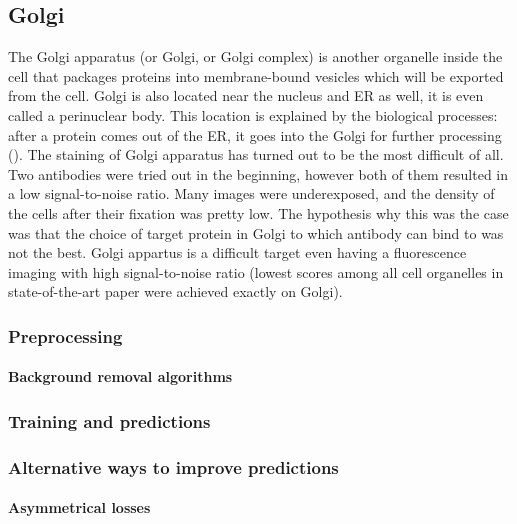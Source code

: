 \subsection{Golgi}
    The Golgi apparatus (or Golgi, or Golgi complex) is another organelle inside the cell that packages proteins into membrane-bound vesicles which will be exported from the cell. Golgi is also located near the nucleus and ER as well, it is even called a perinuclear body. This location is explained by the biological processes: after a protein comes out of the ER, it goes into the Golgi for further processing (\cite{golgi}). The staining of Golgi apparatus has turned out to be the most difficult of all. Two antibodies were tried out in the beginning, however both of them resulted in a low signal-to-noise ratio. Many images were underexposed, and the density of the cells after their fixation was pretty low. The hypothesis why this was the case was that the choice of target protein in Golgi to which antibody can bind to was not the best. Golgi appartus is a difficult target even having a fluorescence imaging with high signal-to-noise ratio (lowest scores among all cell organelles in state-of-the-art paper \cite{Cheng_2021} were achieved exactly on Golgi).
    \subsubsection{Preprocessing}
        
        \paragraph{Background removal algorithms}
            \label{par:background-removal}
            
    \subsubsection{Training and predictions}
        

    \subsubsection{Alternative ways to improve predictions}
        \paragraph{Asymmetrical losses}
            
